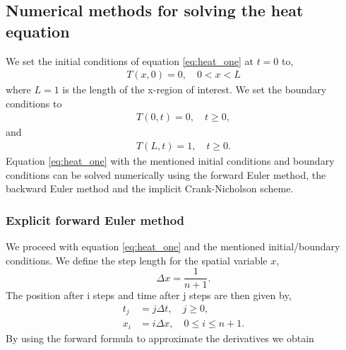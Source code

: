 \documentclass{article}
\begin{document}
\begin{multicols}{2}
\subsection{Numerical methods for solving the heat equation}
We set the initial conditions of equation \eqref{eq:heat_one} at $t=0$ to,
\begin{align}
	T(x,0)=0, \quad 0<x<L
\end{align}
where $L=1$ is the length of the x-region of interest. We set the boundary conditions to
\begin{align}
	T(0, t)=0, \quad t\geq 0,
\end{align}
and
\begin{align}
	T(L, t)= 1, \quad t\geq 0.
\end{align}
Equation \eqref{eq:heat_one} with the mentioned initial conditions and boundary conditions can be solved numerically using the forward Euler method, the backward Euler method and the implicit Crank-Nicholson scheme. 

\subsubsection{Explicit forward Euler method}
We proceed with equation \eqref{eq:heat_one} and the mentioned initial/boundary conditions. We define the step length for the spatial variable $x$,
\begin{equation}
	\Delta x=\frac{1}{n+1}.
\end{equation}
The position after i steps and time after j steps are then given by,
\begin{align*}
	t_j &= j\Delta t, \quad j \geq 0, \\
	x_i &= i\Delta x, \quad 0 \leq i \leq n+1.
\end{align*}
By using the forward formula to approximate the derivatives we obtain 

\end{multicols}
\end{document}
